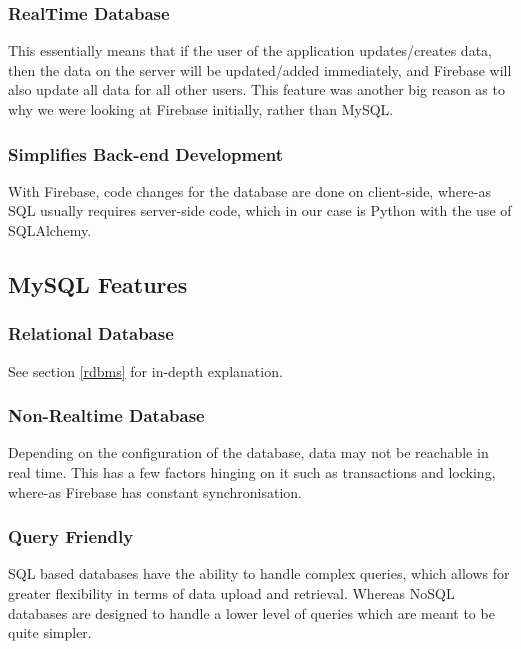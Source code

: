 \subsubsection{RealTime Database}
This essentially means that if the user of the application updates/creates data, then the data on the server will be updated/added immediately, and Firebase will also update all data for all other users. This feature was another big reason as to why we were looking at Firebase initially, rather than MySQL.
\subsubsection{Simplifies Back-end Development}
With Firebase, code changes for the database are done on client-side, where-as SQL usually requires server-side code, which in our case is Python with the use of SQLAlchemy.

\subsection{MySQL Features}
\subsubsection{Relational Database}
See section \ref{rdbms} for in-depth explanation.
\subsubsection{Non-Realtime Database}
Depending on the configuration of the database, data may not be reachable in real time. This has a few factors hinging on it such as transactions and locking, where-as Firebase has constant synchronisation.
\subsubsection{Query Friendly}
SQL based databases have the ability to handle complex queries, which allows for greater flexibility  in terms of data upload and retrieval. Whereas NoSQL databases are designed to handle a lower level of queries which are meant to be quite simpler.
